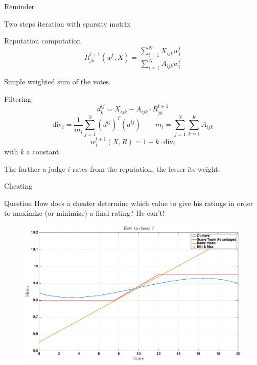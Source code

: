 \begin{frame}{Reminder}
       
\end{frame}

\begin{frame}{Two steps iteration with sparsity matrix}

    \begin{block}{Reputation computation}
        \[
            R_{jk}^{t+1}(w^t,X) = \frac{\sum_{i=1}^N X_{ijk}w^t_{i}}{\sum_{i=1}^{N} A_{ijk} w^t_{i}}
        \]
    \end{block}
    Simple weighted sum of the votes.
    
    \begin{block}{Filtering}
                                \[ d^{ij}_k = X_{ijk}-A_{ijk} \cdot R^{t+1}_{jk} \]
                                \[ \mathrm{div}_i =  \frac{1}{m_i}\sum_{j=1}^N (d^{ij})^T (d^{ij}) \qquad m_i = \sum_{j=1}^{N} \sum_{k=1}^{K} A_{ijk}\]
                                \[ w_i^{t+1}(X,R) = 1 -k \cdot \mathrm{div}_i \]
                                with $k$ a constant.
    \end{block}
    The farther a judge $i$ rates from the reputation, the lesser its weight.
       
\end{frame}

\begin{frame}{Cheating}
        \begin{exampleblock}{Question}
            How does a cheater determine which value to give his ratings in order to maximize (or minimize) a final rating? He can't!
        \end{exampleblock}
        
        \begin{figure}
            \centering
            \includegraphics[width=\textwidth]{../rapport/images/cheaters/howto.eps}
        \end{figure}
\end{frame}

